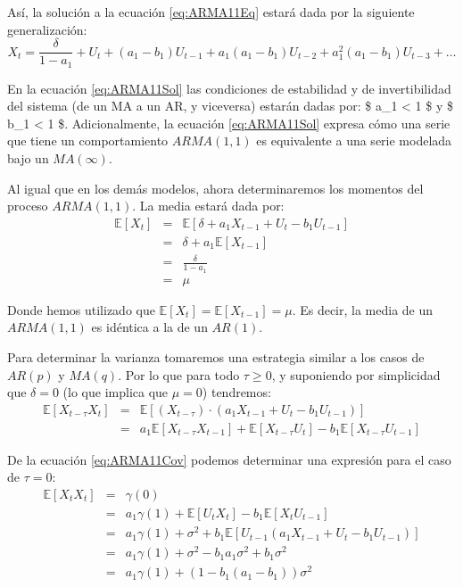 \documentclass[
]{book}
\begin{document}
Así, la solución a la ecuación \eqref{eq:ARMA11Eq} estará dada por la siguiente generalización:
\begin{equation}
    X_t = \frac{\delta}{1 - a_1} + U_t + (a_1 - b_1) U_{t - 1} + a_1(a_1 - b_1) U_{t - 2} + a_1^2(a_1 - b_1) U_{t - 3} + \ldots
    \label{eq:ARMA11Sol}
\end{equation}

En la ecuación \eqref{eq:ARMA11Sol} las condiciones de estabilidad y de invertibilidad del sistema (de un MA a un AR, y viceversa) estarán dadas por: \$ \textbar{} a\_1 \textbar{} \textless{} 1 \$ y \$ \textbar{} b\_1 \textbar{} \textless{} 1 \$. Adicionalmente, la ecuación \eqref{eq:ARMA11Sol} expresa cómo una serie que tiene un comportamiento \(ARMA(1, 1)\) es equivalente a una serie modelada bajo un \(MA(\infty)\).

Al igual que en los demás modelos, ahora determinaremos los momentos del proceso \(ARMA(1, 1)\). La media estará dada por:
\begin{eqnarray}
    \mathbb{E}[X_t] & = & \mathbb{E}[\delta + a_1 X_{t-1} + U_t - b_1 U_{t-1}] \nonumber \\
    & = & \delta + a_1 \mathbb{E}[X_{t-1}] \nonumber \\
    & = & \frac{\delta}{1 - a_1} \nonumber \\
    & = & \mu
\end{eqnarray}

Donde hemos utilizado que \(\mathbb{E}[X_t] = \mathbb{E}[X_{t-1}] = \mu\). Es decir, la media de un \(ARMA(1, 1)\) es idéntica a la de un \(AR(1)\).

Para determinar la varianza tomaremos una estrategia similar a los casos de \(AR(p)\) y \(MA(q)\). Por lo que para todo \(\tau \geq 0\), y suponiendo por simplicidad que \(\delta = 0\) (lo que implica que \(\mu = 0\)) tendremos:
\begin{eqnarray}
    \mathbb{E}[X_{t-\tau} X_t] & = & \mathbb{E}[(X_{t-\tau}) \cdot (a_1 X_{t-1} + U_t - b_1 U_{t-1})] \nonumber \\
    & = & a_1 \mathbb{E}[X_{t-\tau} X_{t-1}] + \mathbb{E}[X_{t-\tau} U_t] - b_1 \mathbb{E}[X_{t-\tau} U_{t-1}]
    \label{eq:ARMA11Cov}
\end{eqnarray}

De la ecuación \eqref{eq:ARMA11Cov} podemos determinar una expresión para el caso de \(\tau = 0\):
\begin{eqnarray}
    \mathbb{E}[X_{t} X_t] & = & \gamma(0) \nonumber \\
    & = & a_1 \gamma(1) + \mathbb{E}[U_t X_t] - b_1 \mathbb{E}[X_t U_{t-1}] \nonumber \\
    & = & a_1 \gamma(1) + \sigma^2 + b_1 \mathbb{E}[U_{t-1} (a_1 X_{t-1} + U_t - b_1 U_{t-1})] \nonumber \\
    & = & a_1 \gamma(1) + \sigma^2 - b_1 a_1 \sigma^2 + b_1 \sigma^2 \nonumber \\
    & = & a_1 \gamma(1) + (1 - b_1 (a_1 - b_1)) \sigma^2
\end{eqnarray}
\end{document}
